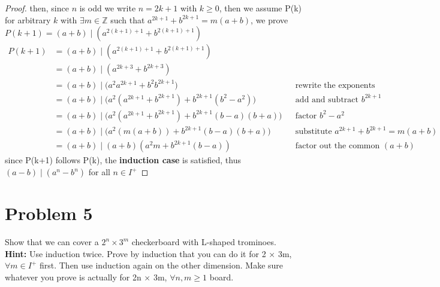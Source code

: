 \begin{enumerate}[label=\arabic*.]
\begin{proof}
    then, since $n$ is odd we write $n = 2k+1$ with $k \ge 0$, then we
  assume P(k) for arbitrary $k$ with $\exists m \in \mathbb{Z}$ such
  that $a^{2k+1} + b^{2k+1} = m(a+b)$, we prove $P(k+1) = (a+b) \mid
  (a^{2(k+1)+1} + b^{2(k+1)+1})$
    \begin{align*}
    P(k+1)
    &= (a+b) \mid (a^{2(k+1)+1} + b^{2(k+1)+1}) \\
    &= (a+b) \mid (a^{2k+3} + b^{2k+3}) \\
    &= (a+b) \mid \bigl(a^2 a^{2k+1} + b^2 b^{2k+1}\bigr)
    && \text{rewrite the exponents} \\
    &= (a+b) \mid \bigl(
    a^2(a^{2k+1} + b^{2k+1})
    + b^{2k+1}(b^2 - a^2)
    \bigr)
    && \text{add and subtract } b^{2k+1} \\
    &= (a+b) \mid \bigl(
    a^2(a^{2k+1} + b^{2k+1})
    + b^{2k+1}(b-a)(b+a)
    \bigr)
    && \text{factor } b^2 - a^2 \\
    &= (a+b) \mid \bigl(
        a^2(m(a+b))
    + b^{2k+1}(b-a)(b+a)\bigr)
        && \text{substitute } a^{2k+1} + b^{2k+1} = m(a+b)
     \\
    &= (a+b) \mid 
        (a+b)(a^2m + b^{2k+1}(b-a))
        && \text{factor out the common } (a+b)
    \end{align*}
    since P(k+1) follows P(k), the \textbf{induction case} is
  satisfied, thus $(a-b) \mid (a^n - b^n)$ for all $n \in I^+$
   \end{proof}
    \end{enumerate}

\vspace{1em}
\hrulefill

\section*{Problem 5}
Show that we can cover a $2^n \times 3^m$ checkerboard with L-shaped trominoes. \\
\textbf{Hint:} Use induction twice. Prove by induction that you can do it for 2 × 3m, $\forall m \in I^+$ first. Then use induction again on the other dimension.
Make sure whatever you prove is actually for 2n × 3m, $\forall n, m \ge 1$ board.

\medskip
\solution


